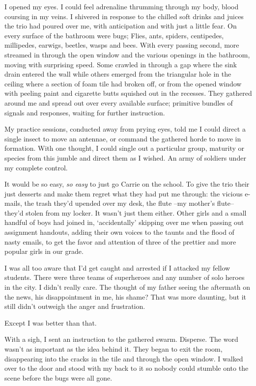 I opened my eyes. I could feel adrenaline thrumming through my body, blood coursing in my veins. I shivered in response to the chilled soft drinks and juices the trio had poured over me, with anticipation and with just a little fear. On every surface of the bathroom were bugs; Flies, ants, spiders, centipedes, millipedes, earwigs, beetles, wasps and bees. With every passing second, more streamed in through the open window and the various openings in the bathroom, moving with surprising speed. Some crawled in through a gap where the sink drain entered the wall while others emerged from the triangular hole in the ceiling where a section of foam tile had broken off, or from the opened window with peeling paint and cigarette butts squished out in the recesses. They gathered around me and spread out over every available surface; primitive bundles of signals and responses, waiting for further instruction.

My practice sessions, conducted away from prying eyes, told me I could direct a single insect to move an antennae, or command the gathered horde to move in formation. With one thought, I could single out a particular group, maturity or species from this jumble and direct them as I wished. An army of soldiers under my complete control.

It would be so easy, \emph{so easy} to just go Carrie on the school. To give the trio their just desserts and make them regret what they had put me through: the vicious e-mails, the trash they'd upended over my desk, the flute --my mother's flute-- they'd stolen from my locker. It wasn't just them either. Other girls and a small handful of boys had joined in, `accidentally' skipping over me when passing out assignment handouts, adding their own voices to the taunts and the flood of nasty emails, to get the favor and attention of three of the prettier and more popular girls in our grade.

I was all too aware that I'd get caught and arrested if I attacked my fellow students. There were three teams of superheroes and any number of solo heroes in the city. I didn't really care. The thought of my father seeing the aftermath on the news, his disappointment in me, his shame? That was more daunting, but it still didn't outweigh the anger and frustration.

Except I was better than that.

With a sigh, I sent an instruction to the gathered swarm. Disperse. The word wasn't as important as the idea behind it. They began to exit the room, disappearing into the cracks in the tile and through the open window. I walked over to the door and stood with my back to it so nobody could stumble onto the scene before the bugs were all gone.

